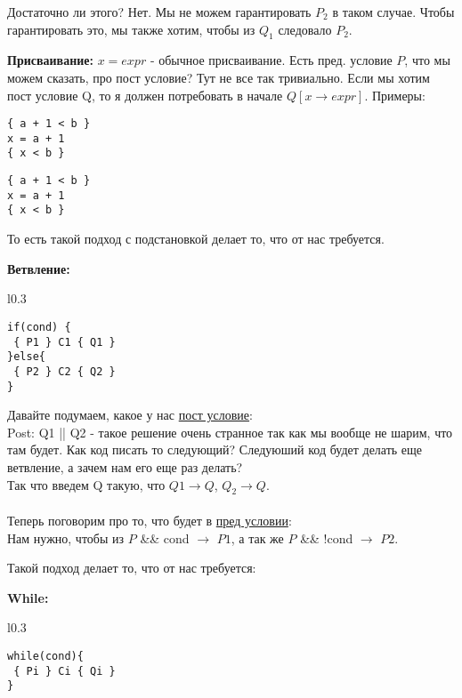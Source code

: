 Достаточно ли этого? Нет. Мы не можем гарантировать $P_2$ в таком случае. Чтобы гарантировать это, мы  также хотим, чтобы из $Q_1$ следовало $P_2$.

\textbf{Присваивание:} $x = expr$ - обычное присваивание. Есть пред. условие $P$, что мы можем сказать, про пост условие? Тут не все так тривиально. Если мы хотим пост условие Q, то я должен потребовать в начале $Q[x \rightarrow expr]$. Примеры:


\begin{minipage}[h]{0.3\linewidth}
\begin{verbatim}
{ a + 1 < b }
x = a + 1
{ x < b }
\end{verbatim}
\end{minipage}
\hfill 
\begin{minipage}[h]{0.6\linewidth}
\begin{verbatim}
{ a + 1 < b }
x = a + 1
{ x < b }
\end{verbatim}
\end{minipage}

То есть такой подход с подстановкой делает то, что от нас требуется.

\textbf{Ветвление:}

\begin{wrapfigure}{l}{0.3\linewidth} 
   \begin{verbatim}
if(cond) {
 { P1 } C1 { Q1 }
}else{
 { P2 } C2 { Q2 }
}
\end{verbatim}
\end{wrapfigure}

Давайте подумаем, какое у нас  \uline{пост условие}:\\  Post: Q1 || Q2 - такое решение очень странное так как мы вообще не шарим, что там будет. Как код писать то следующий? Следуюший код будет делать еще ветвление, а зачем нам его еще раз делать?  \\Так что введем Q такую, что $Q1 \rightarrow Q$, $Q_2 \rightarrow Q$. \\ \\ Теперь поговорим про то, что будет в \uline{пред условии}:\\ Нам нужно, чтобы из $P$ \&\&  cond $\rightarrow$ $P1$, а так же $P$ \&\& !cond $\rightarrow$ $P2$.

Такой подход делает то, что от нас требуется:

\textbf{While:} 

\begin{wrapfigure}{l}{0.3\linewidth} 
   \begin{verbatim}
while(cond){
 { Pi } Ci { Qi } 
}
\end{verbatim}
\end{wrapfigure}

